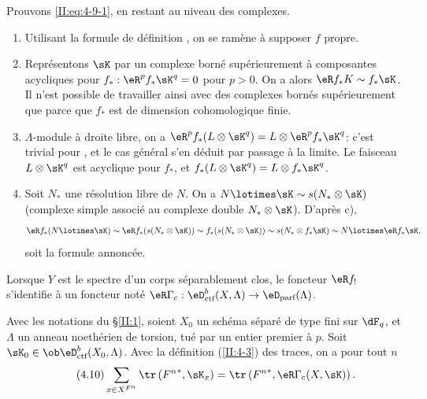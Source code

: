 Prouvons \eqref{II:eq:4-9-1}, en restant au niveau des complexes. 
\begin{enumerate}[\indent a)]
  \item Utilisant la formule de définition , on se 
    ramène à supposer $f$ propre. 
  \item {}Représentons $\sK$ par un complexe borné 
    supérieurement à composantes acycliques pour $f_*:\eR^p f_* \sK^q = 0$ 
    pour $p>0$. On a alors $\eR f_* K \sim f_* \sK$. Il n'est possible de 
    travailler ainsi avec des complexes bornés supérieurement que parce que 
    $f_*$ est de dimension cohomologique finie. 
  \item {} $\Lambda$-module à droite libre, on a 
    $\eR^p f_*(L\otimes \sK^q) = L\otimes \eR^p f_* \sK^q$: c'est trivial pour 
    , et le cas général s'en déduit par 
    passage à la limite. Le faisceau $L\otimes \sK^q$ est acyclique pour 
    $f_*$, et $f_*(L\otimes \sK^q) = L\otimes f_* \sK^q$. 
  \item Soit $N_*$ une résolution libre de $N$. On a 
    $N\lotimes \sK\sim s(N_*\otimes \sK)$ (complexe simple associé au 
    complexe double $N_*\otimes \sK$). D'après c), 
    \[
      \eR f_*(N\lotimes \sK) \sim \eR f_* (s(N_*\otimes \sK)) \sim f_*(s(N_*\otimes \sK)) \sim s(N_*\otimes f_* \sK) \sim N\lotimes \eR f_* \sK \text{,}
    \]
    soit la formule annoncée. 
\end{enumerate}

Lorsque $Y$ est le spectre d'un corps séparablement clos, le foncteur $\eR f_!$ 
s'identifie à un foncteur noté 
$\eR \Gamma_c : \eD_\text{ctf}^b(X,\Lambda)\to\eD_\text{parf}(\Lambda)$. 





\begin{theorem_}\label{II:4-10}
Avec les notations du \S\ref{II:1}, soient $X_0$ un schéma séparé de type 
fini sur $\dF_q$, et $\Lambda$ un anneau noethérien de torsion, tué par un 
entier premier à $p$. Soit $\sK_0\in\ob\eD_\textnormal{ctf}^b(X_0,\Lambda)$. 
Avec la définition (\ref{II:4-3}) des traces, on a pour tout $n$ 
\begin{equation*}\tag{4.10}\label{II:eq:4-10}
  \sum_{x\in X^{F^n}} \tr\left({F^n}^*,\sK_x\right) = \tr\left({F^n}^*,\eR\Gamma_c(X,\sK)\right) \text{.}
\end{equation*}
\end{theorem_}

